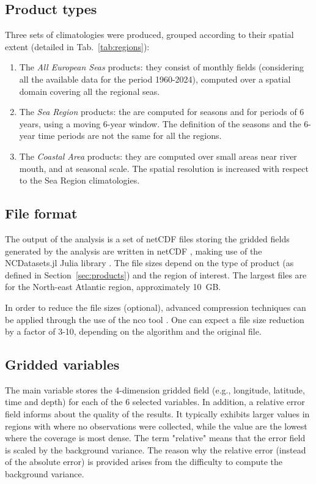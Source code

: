 \documentclass[essd, manuscript]{copernicus}
\begin{document}
\subsection{Product types\label{sec:products}}

Three sets of climatologies were produced, grouped according to their spatial extent (detailed in Tab.~\ref{tab:regions}): 
\begin{enumerate}
\item The \textit{All European Seas} products: they consist of monthly fields (considering all the available data for the period 1960-2024), computed over a spatial domain covering all the regional seas.
\item The \textit{Sea Region} products: the are computed for seasons and for periods of 6 years, using a moving 6-year window. The definition of the seasons and the 6-year time periods are not the same for all the regions. 
\item The \textit{Coastal Area} products: they are computed over small areas near river mouth, and at seasonal scale. The spatial resolution is increased with respect to the Sea Region climatologies.
\end{enumerate}

\subsection{File format}

The output of the analysis is a set of netCDF files storing the gridded fields generated by the analysis are written in netCDF \citep{Rew1990,Brown1993,Rew2006}, making use of the NCDatasets.jl Julia library \citep{Barth2024}. The file sizes depend on the type of product (as defined in Section~\ref{sec:products}) and the region of interest. The largest files are for the North-east Atlantic region, approximately 10~\unit{GB}.

In order to reduce the file sizes (optional), advanced compression techniques \citep{Silver2017,Zender2016} can be applied through the use of the nco tool \citep[netCDF operators,][]{Zender2008}. One can expect a file size reduction by a factor of 3-10, depending on the algorithm and the original file.

\subsection{Gridded variables}

The main variable stores the 4-dimension gridded field (e.g., longitude, latitude, time and depth) for each of the 6 selected variables. In addition, a relative error field informs about the quality of the results. It typically exhibits larger values in regions with where no observations were collected, while the value are the lowest where the coverage is most dense. The term "relative" means that the error field is scaled by the background variance. The reason why the relative error (instead of the absolute error) is provided arises from the difficulty to compute the background variance.  
\end{document}
